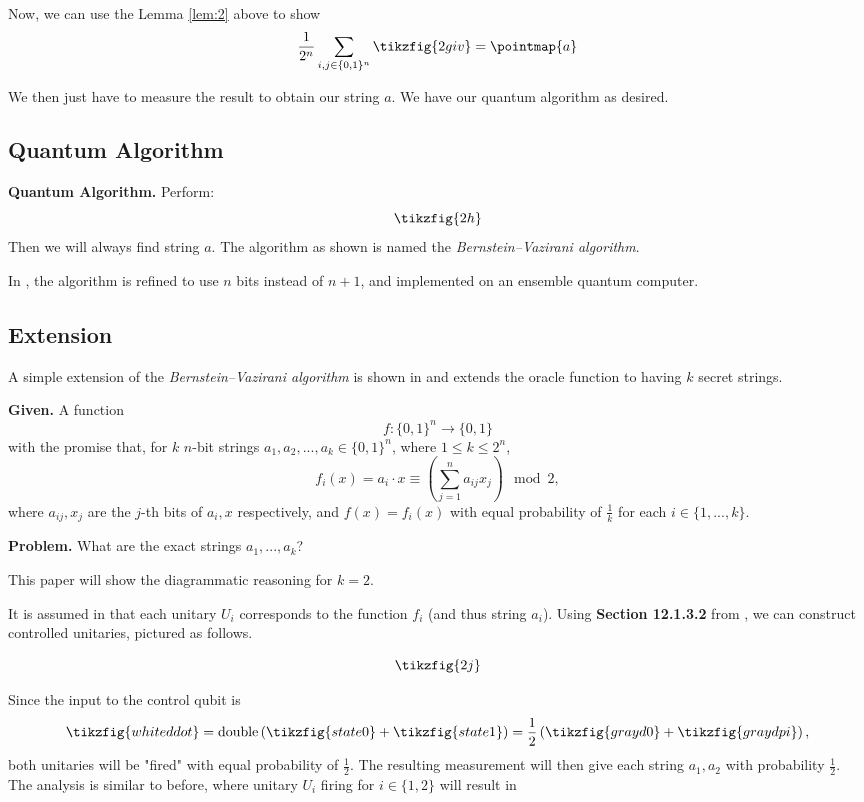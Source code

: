 \documentclass[11pt]{article} %
\theoremstyle{definition}
\begin{document}
Now, we can use the Lemma \ref{lem:2} above to show
\[\frac{1}{2^n}\sum_{i,j\in\{0,1\}^n}\tikzfig{2giv}=\pointmap{a}\]

We then just have to measure the result to obtain our string $a$.
We have our quantum algorithm as desired.

\subsection*{Quantum Algorithm}
\textbf{Quantum Algorithm.} Perform:
\[\tikzfig{2h}\]
Then we will always find string $a$.
The algorithm as shown is named the \textit{Bernstein–Vazirani algorithm}.

In \cite{Du_2001}, the algorithm is refined to use $n$ bits instead of $n+1$, 
and implemented on an ensemble quantum computer.

\subsection*{Extension}
A simple extension of the \textit{Bernstein–Vazirani algorithm} is shown in \cite{Shukla_2023}
and extends the oracle function to having $k$ secret strings.

\textbf{Given.} A function 
\[f:\{0,1\}^n \rightarrow \{0,1\}\] 
with the promise that, for $k$ $n$-bit strings $a_1,a_2,...,a_k\in\{0,1\}^n$, where $1\leq k \leq 2^n$,
\[f_i(x)=a_i\cdot x \equiv \left(\sum_{j=1}^n a_{ij} x_j\right) \mod 2,\]
where $a_{ij},x_j$ are the $j$-th bits of $a_i,x$ respectively,
and $f(x)=f_i(x)$ with equal probability of $\frac{1}{k}$ for each $i\in\{1,...,k\}$.

\textbf{Problem.} What are the exact strings $a_1,...,a_k$?

This paper will show the diagrammatic reasoning for $k=2$.

It is assumed in \cite{Shukla_2023} that each unitary $U_i$ 
corresponds to the function $f_i$ (and thus string $a_i$).
Using \textbf{Section 12.1.3.2} from \cite{coecke2017picturing}, 
we can construct controlled unitaries, pictured as follows.

\[\tikzfig{2j}\]

Since the input to the control qubit is 
\[\tikzfig{whiteddot}=\text{double}\left(\tikzfig{state0}+\tikzfig{state1}\right)
=\frac{1}{2}\left(\tikzfig{grayd0}+\tikzfig{graydpi}\right),\]
both unitaries will be "fired" with equal probability of $\frac{1}{2}$.
The resulting measurement will then give each string $a_1,a_2$ with probability $\frac{1}{2}$.
The analysis is similar to before, where unitary $U_i$ firing for $i\in\{1,2\}$  will result in
\end{document}
